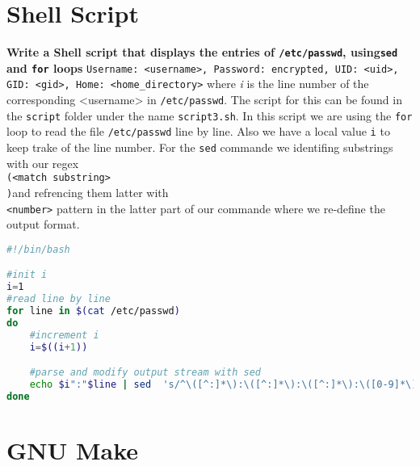 \documentclass[a4paper,oneside,onecolumn]{article}
\newcommand{\code}[1]{\colorbox{codegray}{\texttt{#1}}}
\begin{document}
\section*{Shell Script}
\noindent
\textbf{Write a Shell script that displays the entries of \texttt{/etc/passwd}, using\code{sed} and \code{for} loops}
\newline
\newline
\texttt{Username: <username>, Password: encrypted, UID: <uid>, GID: <gid>, Home: <home\_directory>}
\newline
where \emph{i} is the line number of the corresponding <username> in \texttt{/etc/passwd}.
\newline
\newline
The script for this can be found in the \texttt{script} folder under the name \texttt{script3.sh}.
\newline
In this script we are using the \code{for} loop to read the file \texttt{/etc/passwd} line by line. Also we have a local value \code{i} to keep trake of the line number. For the \code{sed} commande we identifing substrings with our regex \code{\\(<match substring>\\)}and refrencing them latter with \code{\\<number>} pattern in the latter part of our commande where we re-define the output format.
\begin{lstlisting}[language=bash,caption={RegEx in Shell Script}]
#!/bin/bash

#init i
i=1
#read line by line
for line in $(cat /etc/passwd)
do
    #increment i
    i=$((i+1))

    #parse and modify output stream with sed
    echo $i":"$line | sed  's/^\([^:]*\):\([^:]*\):\([^:]*\):\([0-9]*\):\([0-9]*\)::\([^:]*\).*/\1) Username: \2 ,Password: encrypted, UID: \4, GID: \5, Home: \6/'
done
\end{lstlisting}


\section*{GNU Make}
\end{document}
